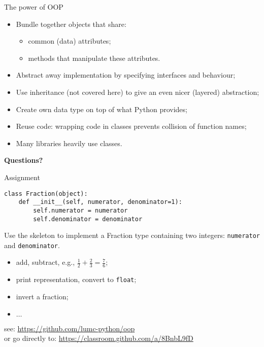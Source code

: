 \documentclass{beamer}
\begin{document}
\begin{frame}{The power of OOP}
\begin{itemize}
\item \textcolor{pms280_compl}{Bundle} together objects that share:
\begin{itemize}
\item common (data) attributes;
\item methods that manipulate these attributes.
\end{itemize}

\item \textcolor{pms280_compl}{Abstract away} implementation by
specifying interfaces and behaviour;

\item Use \textcolor{pms280_compl}{inheritance} (not covered here)
to give an even nicer (layered) abstraction;

\item \textcolor{pms280_compl}{Create} own data type on top of what
Python provides;

\item \textcolor{pms280_compl}{Reuse} code: wrapping code in classes
prevents collision of function names;

\item Many \textcolor{pms280_compl}{libraries} heavily use classes.
\end{itemize}

\vfill

\begin{center}
\textcolor{pms280}{\Large \textbf{Questions?}}
\end{center}
\end{frame}

\begin{frame}[fragile]{Assignment}
\begin{verbatim}
class Fraction(object):
    def __init__(self, numerator, denominator=1):
        self.numerator = numerator
        self.denominator = denominator
\end{verbatim}

\bigskip

Use the skeleton to implement a \textcolor{pms280_compl}{Fraction} type
containing two integers: \texttt{numerator} and
\texttt{denominator}.

\begin{itemize}
\item add, subtract, e.g., $\frac{1}{2} + \frac{2}{3} = \frac{7}{6}$;
\item print representation, convert to \texttt{float};
\item invert a fraction;
\item $\ldots$
\end{itemize}

\bigskip

see: \url{https://github.com/lumc-python/oop} \\
or go directly to: \textcolor{pms280_compl}{\url{https://classroom.github.com/a/8BnbL9fD}}
\end{frame}
\end{document}
